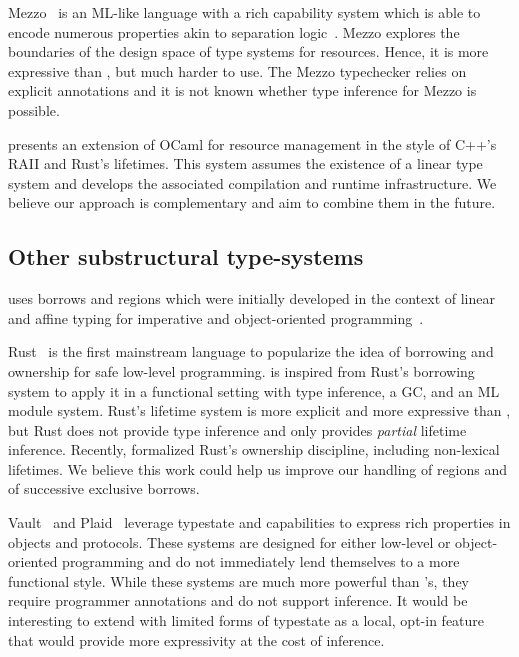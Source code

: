 Mezzo~\citep{DBLP:phd/hal/Protzenko14} is an ML-like language
with a rich capability system which is able to encode numerous
properties akin to separation logic~\citep{DBLP:conf/lics/Reynolds02}.
Mezzo explores the  boundaries of the design space of type systems for
resources. Hence, it is more expressive than \lang, but
much harder to use. The Mezzo typechecker relies on explicit
annotations and it is not known whether type inference for Mezzo is possible.

\citet{DBLP:journals/corr/abs-1803-02796} presents
an extension of OCaml for resource management in the style of C++'s RAII
and Rust's lifetimes. This system assumes
the existence of a linear type system and develops the associated compilation
and runtime infrastructure. We believe our approach is
complementary and aim to combine them in the future.

\subsection{Other substructural type-systems}

\lang uses borrows and regions
which were initially developed in the context of linear and affine
typing for  imperative and
object-oriented
programming~\citep{DBLP:conf/popl/BoylandR05,DBLP:conf/pldi/GrossmanMJHWC02}.

Rust~\citep{rust} is the first
mainstream language to popularize the idea of borrowing and ownership
for safe low-level programming.
\lang is inspired from Rust's borrowing system to apply
it in a functional setting with type inference, a GC, and
an ML module system.
Rust's lifetime system is more explicit and more expressive than \lang,
but Rust does not provide type inference
and only provides \emph{partial} lifetime inference.
Recently, \citet{DBLP:journals/corr/abs-1903-00982}
formalized Rust's ownership discipline, including non-lexical lifetimes.
We believe this work
could help us improve our handling of regions and of successive exclusive borrows.

Vault~\citep{DBLP:conf/pldi/DeLineF01}
and Plaid~\citep{DBLP:conf/oopsla/AldrichSSS09}
leverage typestate and capabilities
to express rich properties in objects and protocols.
These systems are designed for either low-level or object-oriented
programming and do not immediately lend themselves to a more functional
style. While these systems are much more
powerful than \affe's, they require programmer annotations
and do not support inference.
It  would be interesting to extend \lang with limited
forms of typestate as a local, opt-in feature that would provide
more expressivity at the cost of inference.


